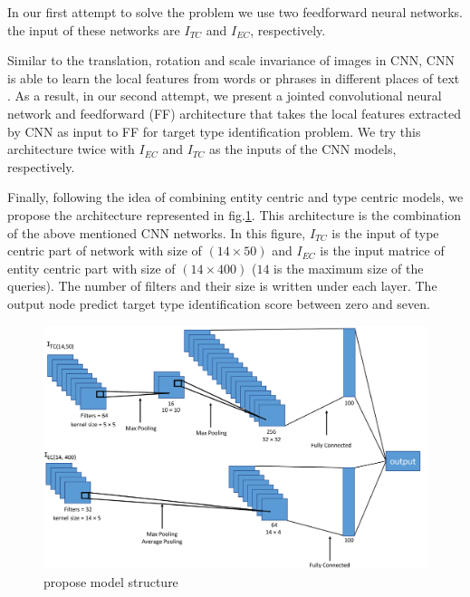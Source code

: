 In our first attempt to solve the problem we use two feedforward neural networks. the input of these networks are $I_{TC}$ and $I_{EC}$, respectively.


Similar to the translation, rotation and scale invariance of images in CNN, CNN is able to learn the local features from words or phrases in different places of text \cite{wang2016combination}. As a result, in our second attempt, we present a jointed convolutional neural network and feedforward (FF) architecture that takes the local features extracted by CNN as input to FF for target type identification problem. We try this architecture twice with $I_{EC}$ and $I_{TC}$ as the inputs of the CNN models, respectively.

Finally, following the idea of combining entity centric and type centric models\cite{Balog:2011:QME:2037661.2037667,Garigliotti:2017:TTI:3077136.3080659}, we propose the architecture represented in fig.\ref{proposeModel}. This architecture is the combination of the above mentioned CNN networks.
In this figure, $I_{TC}$ is the input of type centric part of network with size of $(14\times50)$ and $I_{EC}$ is the input matrice of entity centric part with size of $(14\times400)$ ($14$ is the maximum size of the queries). The number of filters and their size is written under each layer. The output node predict target type identification score between zero and seven.
\begin{figure}
	\includegraphics[width=\textwidth]{1111modelFinalVisualize.pdf} \caption{propose model structure}\label{proposeModel}
\end{figure}
